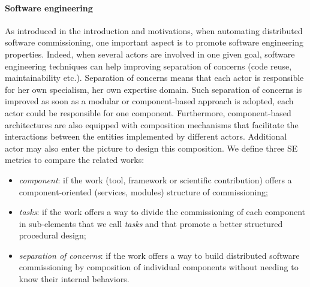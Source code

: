 \paragraph{Software engineering}
As introduced in the introduction and motivations, when automating distributed software commissioning, one important aspect is to promote software engineering properties. Indeed, when several actors are involved in one given goal, software engineering techniques can help improving separation of concerns (\ie code reuse, maintainability etc.). Separation of concerns means that each actor is responsible for her own specialism, \ie her own expertise domain. Such separation of concerns is improved as soon as a modular or component-based approach is adopted, \ie each actor could be responsible for one component. Furthermore, component-based architectures are also equipped with composition mechanisms that facilitate the interactions between the entities implemented by different actors. Additional actor may also enter the picture to design this composition. We define three SE metrics to compare the related works:
\begin{itemize}
	\item \emph{component}: if the work (tool, framework or scientific contribution) offers a component-oriented (\eg services, modules) structure of commissioning;
	\item \emph{tasks}: if the work offers a way to divide the commissioning of each component in sub-elements that we call \emph{tasks} and that promote a better structured procedural design;
	\item \emph{separation of concerns}: if the work offers a way to build distributed software commissioning by composition of individual components without needing to know their internal behaviors.
\end{itemize}

